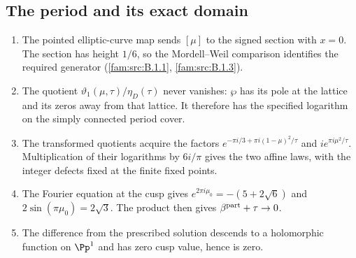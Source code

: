 \subsection{The period and its exact domain}
\RungOne
\begin{enumerate}[label=\arabic*.]
\item The pointed elliptic-curve map sends $[\mu]$ to the signed
section with $x=0$. The section has height $1/6$, so the
Mordell--Weil comparison identifies the required generator
(\ref{fam:src:B.1.1}, \ref{fam:src:B.1.3}).
\item The quotient $\vartheta_1(\mu,\tau)/\eta_D(\tau)$ never vanishes:
$\wp$ has its pole at the lattice and its zeros away from that lattice.
It therefore has the specified logarithm on the simply connected
period cover.
\item The transformed quotients acquire the factors
$e^{-\pi i/3+\pi i(1-\mu)^2/\tau}$ and
$i e^{\pi i\mu^2/\tau}$. Multiplication of their logarithms by
$6i/\pi$ gives the two affine laws, with the integer defects fixed at
the finite fixed points.
\item The Fourier equation at the cusp gives
$e^{2\pi i\mu_0}=-(5+2\sqrt6)$ and
$2\sin(\pi\mu_0)=2\sqrt3$. The product then gives
$\beta^{\rm part}+\tau\to0$.
\item The difference from the prescribed solution descends to a
holomorphic function on $\Pp^1$ and has zero cusp value, hence is zero.
\end{enumerate}

